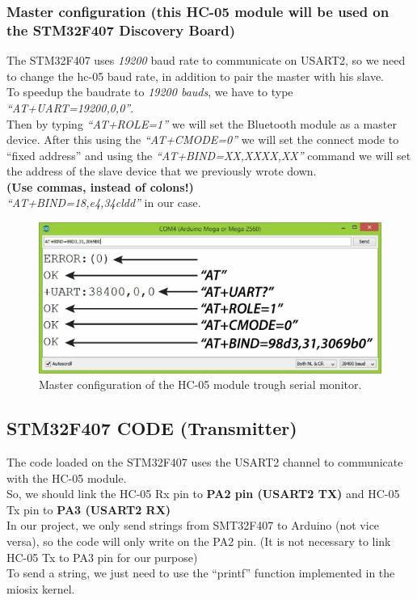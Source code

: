 \subsubsection{Master configuration (this HC-05 module will be used on the STM32F407 Discovery Board)}
The STM32F407 uses \textit{19200} baud rate to communicate on USART2, so we need to change the hc-05 baud rate, in addition to pair the master with his slave.\\
To speedup the baudrate to \textit{19200 bauds}, we have to type \textit{“AT+UART=19200,0,0”}.\\
Then by typing \textit{“AT+ROLE=1”} we will set the Bluetooth module as a master device. After this using the \textit{“AT+CMODE=0”} we will set the connect mode to “fixed address” and using the \textit{“AT+BIND=XX,XXXX,XX”} command we will set the address of the slave device that we previously wrote down.\\ \textbf{(Use commas, instead of colons!)}\\
\textit{“AT+BIND=18,e4,34cldd”} in our case.\\
\begin{figure}[H]
	\centering
	\includegraphics[width=\textwidth]
	{files/images/hc05_master}
	\caption{Master configuration of the HC-05 module trough serial monitor.}
\end{figure}
 
\subsection{STM32F407 CODE (Transmitter)}
The code loaded on the STM32F407 uses the USART2 channel to communicate with the HC-05 module.\\
So, we should link the HC-05 Rx pin to \textbf{PA2 pin (USART2 TX)} and HC-05 Tx pin to \textbf{PA3 (USART2 RX)}\\
In our project, we only send strings from SMT32F407 to Arduino (not vice versa), so the code will only write on the PA2 pin. (It is not necessary to link HC-05 Tx to PA3 pin for our purpose)\\
To send a string, we just need to use the “printf” function implemented in the miosix kernel.\\
